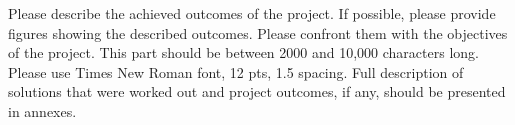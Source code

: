 Please describe the achieved outcomes of the project.
If possible, please provide figures showing the described outcomes.
Please confront them with the objectives of the project.
This part should be between 2000 and 10,000 characters long.
Please use Times New Roman font, 12 pts, 1.5 spacing.
Full description of solutions that were worked out and project outcomes, if any, should be presented in annexes.